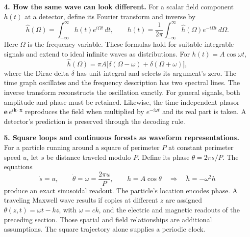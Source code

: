 \documentclass[11pt,letterpaper]{article}
\begin{document}
\textbf{4. How the same wave can look different.}
For a scalar field component $h(t)$ at a detector, define its Fourier transform and inverse by
\begin{equation}
\widehat h(\Omega)=\int_{-\infty}^{\infty}h(t)e^{i\Omega t}\,dt,\qquad
h(t)=\frac1{2\pi}\int_{-\infty}^{\infty}\widehat h(\Omega)e^{-i\Omega t}\,d\Omega.
\end{equation}
Here $\Omega$ is the frequency variable. These formulas hold for suitable integrable signals and extend to ideal infinite waves as distributions. For $h(t)=A\cos\omega t$,
\begin{equation}
\widehat h(\Omega)=\pi A\bigl[\delta(\Omega-\omega)+\delta(\Omega+\omega)\bigr],
\end{equation}
where the Dirac delta $\delta$ has unit integral and selects its argument's zero. The time graph oscillates and the frequency description has two spectral lines. The inverse transform reconstructs the oscillation exactly. For general signals, both amplitude and phase must be retained. Likewise, the time-independent phasor $\mathbf e\,e^{i\mathbf k\cdot\mathbf x}$ reproduces the field when multiplied by $e^{-i\omega t}$ and its real part is taken. A detector's prediction is preserved through the decoding rule.

\textbf{5. Square loops and continuous forests as waveform representations.}
For a particle running around a square of perimeter $P$ at constant perimeter speed $u$, let $s$ be distance traveled modulo $P$. Define its phase $\theta=2\pi s/P$. The equations
\begin{equation}
\dot s=u,\qquad \dot\theta=\omega=\frac{2\pi u}{P},\qquad
h=A\cos\theta
\quad\Longrightarrow\quad \ddot h=-\omega^2h
\end{equation}
produce an exact sinusoidal readout. The particle's location encodes phase. A traveling Maxwell wave results if copies at different $z$ are assigned $\theta(z,t)=\omega t-kz$, with $\omega=ck$, and the electric and magnetic readouts of the preceding section. Those spatial and field relationships are additional assumptions. The square trajectory alone supplies a periodic clock.
\end{document}
